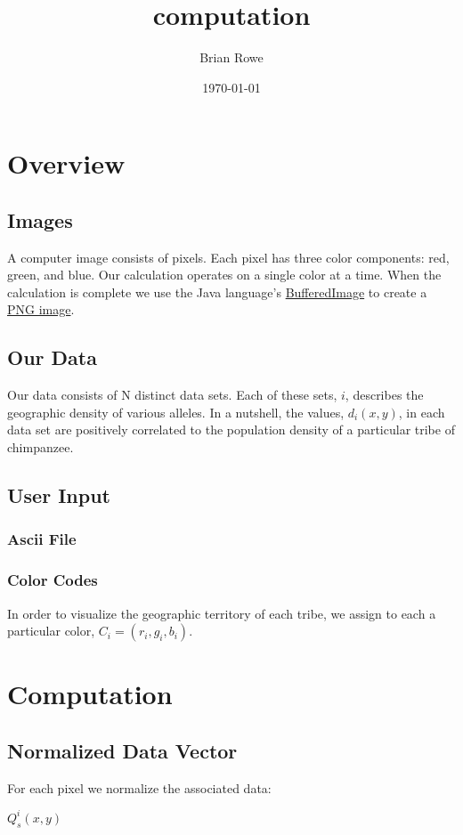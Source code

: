 \documentclass[11pt]{article}
\title{computation}
\author{Brian Rowe}
\date{\today}
\begin{document}
\maketitle

\setcounter{tocdepth}{3}
\tableofcontents
\vspace*{1cm}
\section{Overview}
\label{sec-1}
\subsection{Images}
\label{sec-1-1}


A computer image consists of pixels. Each pixel has three color
components: red, green, and blue. Our calculation operates on a single
color at a time.  When the calculation is complete we use the Java
language's \href{http://docs.oracle.com/javase/6/docs/api/java/awt/image/BufferedImage.html}{BufferedImage} to create a \href{http://www.libpng.org/pub/png/}{PNG image}.
\subsection{Our Data}
\label{sec-1-2}


Our data consists of N distinct data sets. Each of these sets, $i$,
describes the geographic density of various alleles. In a nutshell,
the values, $d_i(x,y)$, in each data set are positively correlated to
the population density of a particular tribe of chimpanzee.
\subsection{User Input}
\label{sec-1-3}
\subsubsection{Ascii File}
\label{sec-1-3-1}
\subsubsection{Color Codes}
\label{sec-1-3-2}


In order to visualize the geographic territory of each tribe, we
assign to each a particular color, $C_i=(r_i,g_i,b_i)$.
\section{Computation}
\label{sec-2}
\subsection{Normalized Data Vector}
\label{sec-2-1}


For each pixel we normalize the associated data:



$Q_s^i(x,y)$
\end{document}

